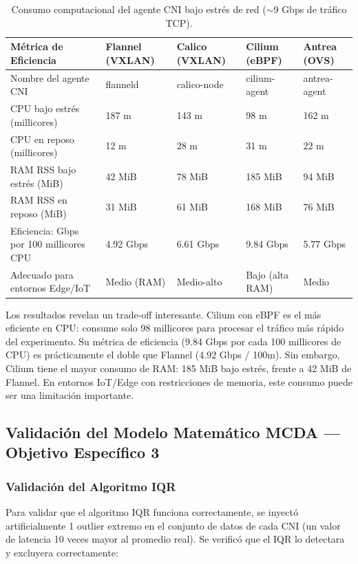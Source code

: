 \begin{table}[htbp]
\centering
\scriptsize
\begin{tabularx}{\textwidth}{|Y|Y|Y|Y|Y|}
\hline
\textbf{Métrica de Eficiencia} & \textbf{Flannel (VXLAN)} & \textbf{Calico (VXLAN)} & \textbf{Cilium (eBPF)} & \textbf{Antrea (OVS)} \\
\hline
Nombre del agente CNI & flanneld & calico-node & cilium-agent & antrea-agent \\
CPU bajo estrés (millicores) & 187 m & 143 m & 98 m & 162 m \\
CPU en reposo (millicores) & 12 m & 28 m & 31 m & 22 m \\
RAM RSS bajo estrés (MiB) & 42 MiB & 78 MiB & 185 MiB & 94 MiB \\
RAM RSS en reposo (MiB) & 31 MiB & 61 MiB & 168 MiB & 76 MiB \\
Eficiencia: Gbps por 100 millicores CPU & 4.92 Gbps & 6.61 Gbps & 9.84 Gbps & 5.77 Gbps \\
Adecuado para entornos Edge/IoT & Medio (RAM) & Medio-alto & Bajo (alta RAM) & Medio \\
\hline
\end{tabularx}
\caption{Consumo computacional del agente CNI bajo estrés de red ($\sim$9 Gbps de tráfico TCP).}
\end{table}

Los resultados revelan un trade-off interesante. Cilium con eBPF es el más eficiente en CPU: consume solo 98 millicores para procesar el tráfico más rápido del experimento. Su métrica de eficiencia (9.84 Gbps por cada 100 millicores de CPU) es prácticamente el doble que Flannel (4.92 Gbps / 100m). Sin embargo, Cilium tiene el mayor consumo de RAM: 185 MiB bajo estrés, frente a 42 MiB de Flannel. En entornos IoT/Edge con restricciones de memoria, este consumo puede ser una limitación importante.

\subsection{Validación del Modelo Matemático MCDA --- Objetivo Específico 3}

\subsubsection{Validación del Algoritmo IQR}

Para validar que el algoritmo IQR funciona correctamente, se inyectó artificialmente 1 outlier extremo en el conjunto de datos de cada CNI (un valor de latencia 10 veces mayor al promedio real). Se verificó que el IQR lo detectara y excluyera correctamente:

